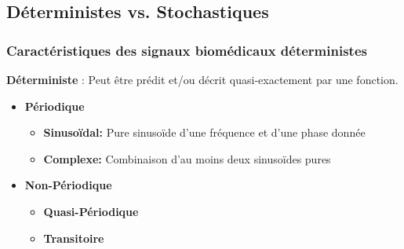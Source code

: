 \documentclass{beamer}
\begin{document}
\subsection{Déterministes vs. Stochastiques}
\begin{frame}
\frametitle{Caractéristiques des signaux biomédicaux déterministes}
\textbf{Déterministe }: Peut être prédit et/ou décrit quasi-exactement par une fonction.
\vspace{0.1cm}
\begin{itemize}
\item \textbf{Périodique} 
\vspace{0.1cm}
\begin{itemize}
 \item \textbf{Sinusoïdal:} Pure sinusoïde d'une fréquence et d'une phase donnée
 \vspace{0.1cm}
 \item \textbf{Complexe:} Combinaison d'au moins deux sinusoïdes pures 
\end{itemize}
 \vspace{0.2cm}
\item \textbf{Non-Périodique }
\begin{itemize}
 \vspace{0.1cm}
 \item \textbf{Quasi-Périodique}
 \vspace{0.1cm}
 \item \textbf{Transitoire} 
\end{itemize}
\end{itemize}
\end{frame}
\end{document}

